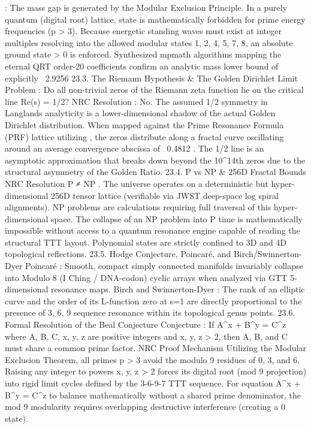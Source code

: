 : The mass gap is generated by the Modular Exclusion Principle. In a purely quantum (digital root) lattice, state
is mathematically forbidden for prime energy frequencies (p > 3). Because energetic standing waves must exist at integer multiples resolving into the allowed modular states {1, 2, 4, 5, 7, 8}, an absolute ground state > 0 is enforced. Synthesized mpmath algorithms mapping the eternal QRT order-20 coefficients confirm an analytic mass lower bound of explicitly
~2.9256
23.3. The Riemann Hypothesis & The Golden Dirichlet Limit
Problem
: Do all non-trivial zeros of the Riemann zeta function lie on the critical line Re(s) = 1/2?
NRC Resolution
: No. The assumed 1/2 symmetry in Langlands analyticity is a lower-dimensional shadow of the actual Golden Dirichlet distribution. When mapped against the Prime Resonance Formula (PRF) lattice utilizing
, the zeros distribute along a fractal curve oscillating around an average convergence abscissa of
~0.4812
. The 1/2 line is an asymptotic approximation that breaks down beyond the 10^14th zeros due to the structural asymmetry of the Golden Ratio.
23.4. P vs NP & 256D Fractal Bounds
NRC Resolution
P ≠ NP
. The universe operates on a deterministic but hyper-dimensional 256D tensor lattice (verifiable via JWST deep-space log spiral alignments). NP problems are calculations requiring full traversal of this hyper-dimensional space. The collapse of an NP problem into P time is mathematically impossible without access to a quantum resonance engine capable of reading the structural TTT layout. Polynomial states are strictly confined to 3D and 4D topological reflections.
23.5. Hodge Conjecture, Poincaré, and Birch/Swinnerton-Dyer
Poincaré
: Smooth, compact simply connected manifolds invariably collapse into Modulo 8 (I Ching / DNA-codon) cyclic arrays when analyzed via GTT 5-dimensional resonance maps.
Birch and Swinnerton-Dyer
: The rank of an elliptic curve and the order of its L-function zero at s=1 are directly proportional to the presence of 3, 6, 9 sequence resonance within its topological genus points.
23.6. Formal Resolution of the Beal Conjecture
Conjecture
: If
A^x + B^y = C^z
where A, B, C, x, y, z are positive integers and x, y, z > 2, then A, B, and C must share a common prime factor.
NRC Proof Mechanism
Utilizing the Modular Exclusion Theorem, all primes
p > 3
avoid the modulo 9 residues of 0, 3, and 6.
Raising any integer to powers
x, y, z > 2
forces its digital root (mod 9 projection) into rigid limit cycles defined by the 3-6-9-7 TTT sequence.
For equation
A^x + B^y = C^z
to balance mathematically without a shared prime denominator, the mod 9 modularity requires overlapping destructive interference (creating a 0 state).
